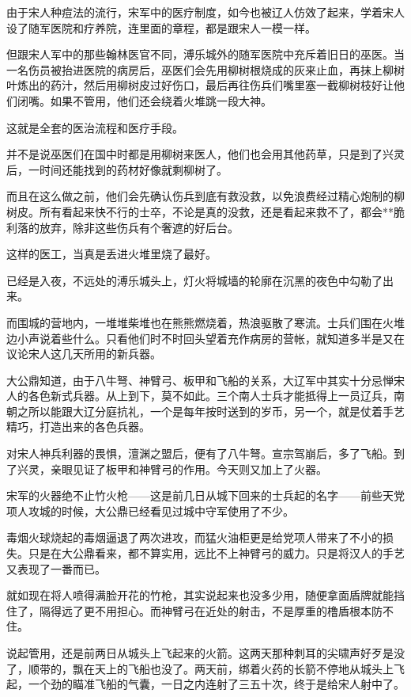 由于宋人种痘法的流行，宋军中的医疗制度，如今也被辽人仿效了起来，学着宋人设了随军医院和疗养院，连里面的章程，都是跟宋人一模一样。

但跟宋人军中的那些翰林医官不同，溥乐城外的随军医院中充斥着旧日的巫医。当一名伤员被抬进医院的病房后，巫医们会先用柳树根烧成的灰来止血，再抹上柳树叶炼出的药汁，然后用柳树皮过好伤口，最后再往伤兵们嘴里塞一截柳树枝好让他们闭嘴。如果不管用，他们还会绕着火堆跳一段大神。

这就是全套的医治流程和医疗手段。

并不是说巫医们在国中时都是用柳树来医人，他们也会用其他药草，只是到了兴灵后，一时间还能找到的药材好像就剩柳树了。

而且在这么做之前，他们会先确认伤兵到底有救没救，以免浪费经过精心炮制的柳树皮。所有看起来快不行的士卒，不论是真的没救，还是看起来救不了，都会**脆利落的放弃，除非这些伤兵有个奢遮的好后台。

这样的医工，当真是丢进火堆里烧了最好。

已经是入夜，不远处的溥乐城头上，灯火将城墙的轮廓在沉黑的夜色中勾勒了出来。

而围城的营地内，一堆堆柴堆也在熊熊燃烧着，热浪驱散了寒流。士兵们围在火堆边小声说着些什么。只看他们时不时回头望着充作病房的营帐，就知道多半是又在议论宋人这几天所用的新兵器。

大公鼎知道，由于八牛弩、神臂弓、板甲和飞船的关系，大辽军中其实十分忌惮宋人的各色新式兵器。从上到下，莫不如此。三个南人士兵才能抵得上一员辽兵，南朝之所以能跟大辽分庭抗礼，一个是每年按时送到的岁币，另一个，就是仗着手艺精巧，打造出来的各色兵器。

对宋人神兵利器的畏惧，澶渊之盟后，便有了八牛弩。宣宗驾崩后，多了飞船。到了兴灵，亲眼见证了板甲和神臂弓的作用。今天则又加上了火器。

宋军的火器绝不止竹火枪——这是前几日从城下回来的士兵起的名字——前些天党项人攻城的时候，大公鼎已经看见过城中守军使用了不少。

毒烟火球烧起的毒烟逼退了两次进攻，而猛火油柜更是给党项人带来了不小的损失。只是在大公鼎看来，都不算实用，远比不上神臂弓的威力。只是将汉人的手艺又表现了一番而已。

就如现在将人喷得满脸开花的竹枪，其实说起来也没多少用，随便拿面盾牌就能挡住了，隔得远了更不用担心。而神臂弓在近处的射击，不是厚重的橹盾根本防不住。

说起管用，还是前两日从城头上飞起来的火箭。这两天那种刺耳的尖啸声好歹是没了，顺带的，飘在天上的飞船也没了。两天前，绑着火药的长箭不停地从城头上飞起，一个劲的瞄准飞船的气囊，一日之内连射了三五十次，终于是给宋人射中了。

